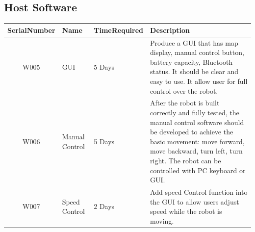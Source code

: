 \documentclass[11pt, a4paper]{report}
\begin{document}


\subsection{Host Software}
\begin{tabular}{|c|p{1cm}|p{3cm}|p{7cm}|}%
\hline
SerialNumber     &	Name 	&	TimeRequired		&	Description	       											\\ \hline
W005		&	GUI	&	5 Days 	&	Produce a GUI that has map display, manual control button, battery capacity, Bluetooth status. It should be clear and easy to use. It allow user for full control over the robot.\\ \hline
W006		&   Manual Control	&	5 Days & After the robot is built correctly and fully tested, the manual control software should be developed to achieve the basic movement: move forward, move backward, turn left, turn right. The robot can be controlled with PC keyboard or GUI. \\ \hline
W007	  & Speed Control 	&	2 Days	& Add speed Control function into the GUI to allow users adjust speed while the robot is moving. \\ \hline
\end{tabular}
\end{document}

